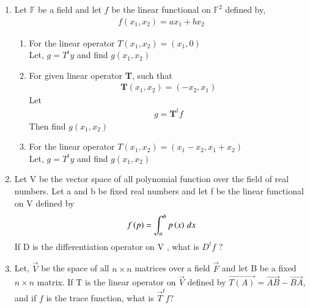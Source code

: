 \renewcommand{\theequation}{\theenumi}
\renewcommand{\thefigure}{\theenumi}
\renewcommand{\thetable}{\theenumi}
\begin{enumerate}[label=\thesubsection.\arabic*.,ref=\thesubsection.\theenumi]

\item Let $\mathbb{F}$ be a field and let $f$ be the linear functional on $\mathbb{F}^2$ defined by,
\begin{align}
f(x_1,x_2) = ax_1+bx_2
\end{align}
\begin{enumerate}
\item For the linear operator $T(x_1,x_2) = (x_1,0)$\\
Let, $g = T^ty$ and find $g(x_1,x_2)$
%
\\
\solution

\item For given linear operator  \textbf{T}, such that
\begin{align}
\textbf{T}(x_1, x_2) = (-x_2, x_1)  \label{eq:solutions/3/7/1/b/1.2}
\end{align}
Let 
\begin{align}
g = \textbf{T}^{t} f
\end{align}
Then find $g(x_1, x_2)$
%
\\
\solution

\item For the linear operator $T(x_1,x_2) = (x_1-x_2,x_1+x_2)$\\
Let, $g = T^ty$ and find $g(x_1,x_2)$
\\
\solution

\end{enumerate}
%
\item Let V be the vector space of all polynomial function over the field of real numbers. Let a and b be fixed real numbers and let f be the linear functional on V defined by  
\begin{align}
    f\left(p\right) = \int_{a}^{b} p\left(x\right) \,dx
\end{align}
If D is the differentiation operator on V , what is $D^{t}f$ ?
%
\\
\solution

\item Let, $\vec{V}$ be the space of all $n \times n$ matrices over a field $\vec{F}$ and let B be a fixed $n \times n$ matrix. If T is the linear operator on $\vec{V}$ defined by $\vec{T(A)} = \vec{AB} - \vec{BA}$, and if $f$ is the trace function, what is $\vec{T}^tf$? 

\end{enumerate}
